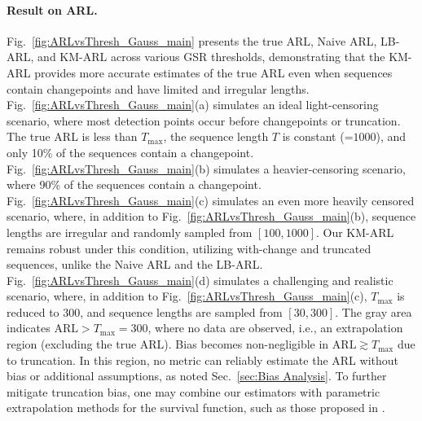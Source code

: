 \documentclass{article}
\theoremstyle{plain}
\theoremstyle{definition}
\theoremstyle{remark}
\begin{document}
\paragraph{Result on ARL.}
Fig.~\ref{fig:ARLvsThresh_Gauss_main} presents the true ARL, Naive ARL, LB-ARL, and KM-ARL across various GSR thresholds, demonstrating that the KM-ARL provides more accurate estimates of the true ARL even when sequences contain changepoints and have limited and irregular lengths.
Fig.~\ref{fig:ARLvsThresh_Gauss_main}(a) simulates an ideal light-censoring scenario, where most detection points occur before changepoints or truncation. The true ARL is less than $T_\mathrm{max}$, the sequence length $T$ is constant (=$1000$), and only 10\% of the sequences contain a changepoint.
Fig.~\ref{fig:ARLvsThresh_Gauss_main}(b) simulates a heavier-censoring scenario, where 90\% of the sequences contain a changepoint.
Fig.~\ref{fig:ARLvsThresh_Gauss_main}(c) simulates an even more heavily censored scenario, where, in addition to Fig.~\ref{fig:ARLvsThresh_Gauss_main}(b), sequence lengths are irregular and randomly sampled from $[100, 1000]$.
Our KM-ARL remains robust under this condition, utilizing with-change and truncated sequences, unlike the Naive ARL and the LB-ARL.
Fig.~\ref{fig:ARLvsThresh_Gauss_main}(d) simulates a challenging and realistic scenario, where, in addition to Fig.~\ref{fig:ARLvsThresh_Gauss_main}(c), $T_\mathrm{max}$ is reduced to $300$, and sequence lengths are sampled from $[30, 300]$.
The gray area indicates $\mathrm{ARL} > T_\mathrm{max} =300$, where no data are observed, i.e., an extrapolation region (excluding the true ARL).
Bias becomes non-negligible in $\mathrm{ARL} \gtrsim T_\mathrm{max}$ due to truncation.
In this region, no metric can reliably estimate the ARL without bias or additional assumptions, as noted Sec.~\ref{sec:Bias Analysis}.
To further mitigate truncation bias, one may combine our estimators with parametric extrapolation methods for the survival function, such as those proposed in \citep{sahki2020performance}.
\end{document}
